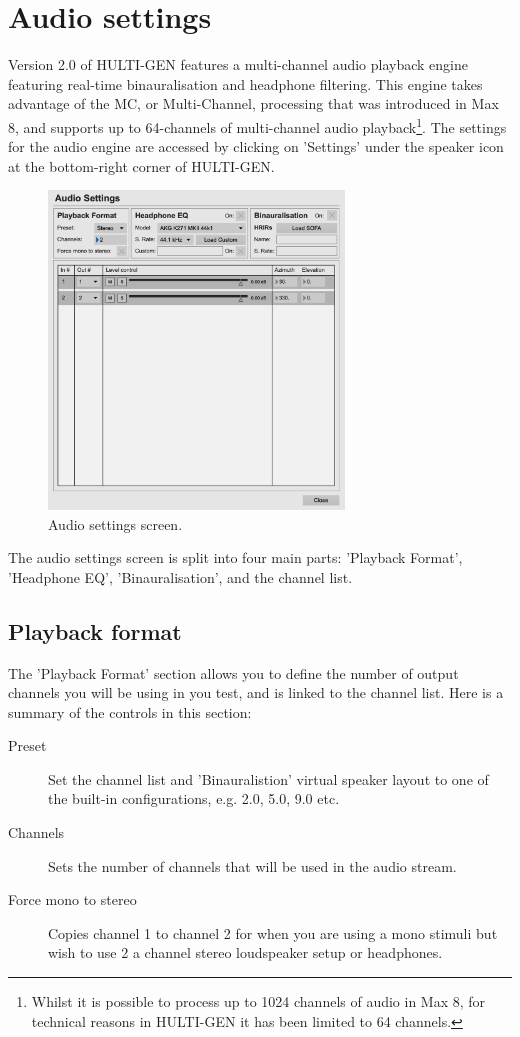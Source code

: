 \chapter{Audio settings}
Version 2.0 of HULTI-GEN features a multi-channel audio playback engine featuring real-time binauralisation and headphone filtering. This engine takes advantage of the MC, or Multi-Channel, processing that was introduced in Max 8, and supports up to 64-channels of multi-channel audio playback\footnote{Whilst it is possible to process up to 1024 channels of audio in Max 8, for technical reasons in HULTI-GEN it has been limited to 64 channels.}. The settings for the audio engine are accessed by clicking on 'Settings' under the speaker icon at the bottom-right corner of HULTI-GEN.

\begin{figure}[h]
	\centering
	\includegraphics[width=0.7\textwidth]{./images/audioSettings_main.png}
	\caption{Audio settings screen.}
	\label{audioSettings::main}
\end{figure}

\noindent
The audio settings screen is split into four main parts: 'Playback Format', 'Headphone EQ', 'Binauralisation', and the channel list.

\section{Playback format}
The 'Playback Format' section allows you to define the number of output channels you will be using in you test, and is linked to the channel list. Here is a summary of the controls in this section:
\begin{description}
	\item[Preset] Set the channel list and 'Binauralistion' virtual speaker layout to one of the built-in configurations, e.g. 2.0, 5.0, 9.0 etc.
	\item[Channels] Sets the number of channels that will be used in the audio stream.
	\item[Force mono to stereo] Copies channel 1 to channel 2 for when you are using a mono stimuli but wish to use 2 a channel stereo loudspeaker setup or headphones.
\end{description}

